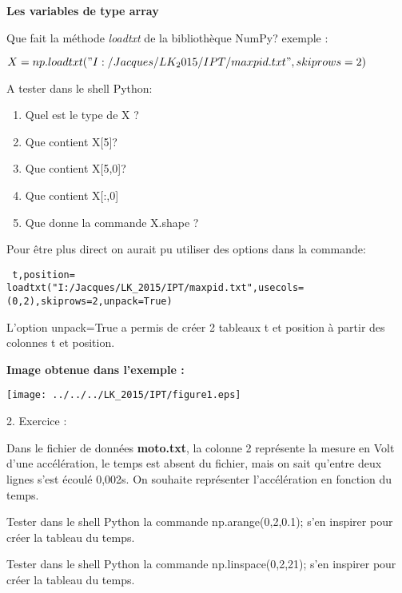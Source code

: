 \documentclass[12pt,a4paper]{article}
\begin{document}
\textbf{Les variables de type array}

Que fait la méthode \textit{loadtxt} de la bibliothèque NumPy? 
exemple : 

$X=np.loadtxt("I:/Jacques/LK_2015/IPT/maxpid.txt",skiprows=2)$

\medskip


A tester dans le shell Python:
\begin{enumerate}
\item Quel est le type de X ?
\item Que contient X[5]?
\item Que contient X[5,0]?
\item Que contient X[:,0]
\item Que donne la commande X.shape ?
\end{enumerate}

Pour être plus direct on aurait pu utiliser des options dans la commande:

\begin{verbatim} t,position= 
loadtxt("I:/Jacques/LK_2015/IPT/maxpid.txt",usecols=(0,2),skiprows=2,unpack=True) 
\end{verbatim}

L'option unpack=True a permis de créer 2 tableaux  t et position à partir des colonnes t et position.

\newpage

\textbf{Image obtenue dans l'exemple :}

\begin{center}
\texttt{[image: ../../../LK\_2015/IPT/figure1.eps]} 
\end{center}

{\Large 2. Exercice }:

Dans le fichier de données \textbf{moto.txt}, la colonne 2 représente la mesure en Volt d'une accélération, le temps est absent du fichier, mais on sait qu'entre deux lignes s'est écoulé 0,002s. On souhaite représenter l'accélération en fonction du temps.

Tester dans le shell Python la commande np.arange(0,2,0.1); s'en inspirer pour créer la tableau du temps.

Tester dans le shell Python la commande np.linspace(0,2,21); s'en inspirer pour créer la tableau du temps.
\end{document}
